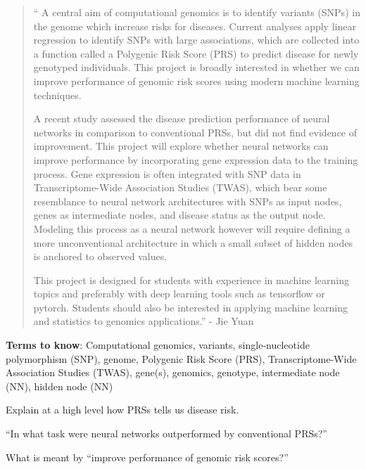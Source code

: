\begin{quotation}
``
A central aim of computational genomics is to identify variants (SNPs) in the genome which increase risks for diseases. Current analyses apply linear regression to identify SNPs with large associations, which are collected into a function called a Polygenic Risk Score (PRS) to predict disease for newly genotyped individuals. This project is broadly interested in whether we can improve performance of genomic risk scores using modern machine learning techniques.

A recent study assessed the disease prediction performance of neural networks in comparison to conventional PRSs, but did not find evidence of improvement. This project will explore whether neural networks can improve performance by incorporating gene expression data to the training process. Gene expression is often integrated with SNP data in Transcriptome-Wide Association Studies (TWAS), which bear some resemblance to neural network architectures with SNPs as input nodes, genes as intermediate nodes, and disease status as the output node. Modeling this process as a neural network however will require defining a more unconventional architecture in which a small subset of hidden nodes is anchored to observed values.

This project is designed for students with experience in machine learning topics and preferably with deep learning tools such as tensorflow or pytorch. Students should also be interested in applying machine learning and statistics to genomics applications.'' - Jie Yuan
\end{quotation}

\textbf{Terms to know}: Computational genomics, variants, single-nucleotide polymorphism (SNP), genome, Polygenic Risk Score (PRS), Transcriptome-Wide Association Studies (TWAS), gene(s), genomics, genotype, intermediate node (NN), hidden node (NN)

\begin{quest}
\item
	Explain at a high level how PRSs tells us disease risk.
\item
	``In what task were neural networks outperformed by conventional PRSs?''
\item
	What is meant by ``improve performance of genomic risk scores?''
\end{quest}

